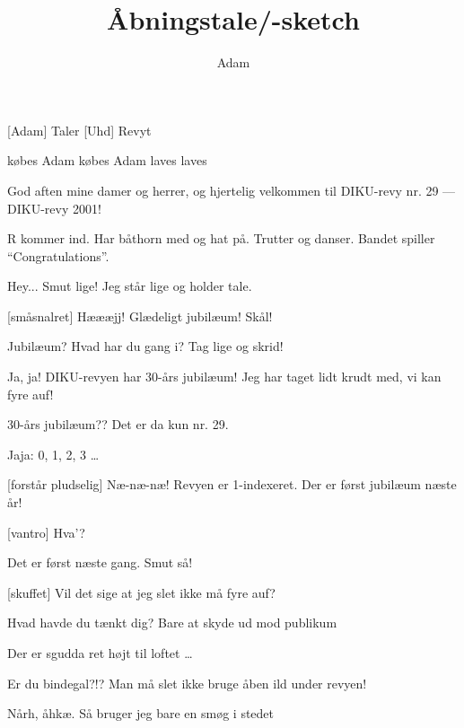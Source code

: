 \documentclass{article}
\title{Åbningstale/-sketch}
\author{Adam}
\begin{document}
\maketitle

\begin{roles}
[Adam] Taler
[Uhd] Revyt
\end{roles}

\begin{props}
 købes Adam
 købes Adam
 laves
 laves
\end{props}


\begin{sketch}

 God aften mine damer og herrer, og hjertelig velkommen til DIKU-revy
nr. 29 --- DIKU-revy 2001!

\scene R kommer ind. Har båthorn med og hat på. Trutter og danser. Bandet
spiller ``Congratulations''.

 Hey... Smut lige! Jeg står lige og holder tale.

[småsnalret] Hæææjj! Glædeligt jubilæum!  Skål!

 Jubilæum? Hvad har du gang i? Tag lige og skrid!

 Ja, ja! DIKU-revyen har 30-års jubilæum! 
Jeg har taget lidt krudt med, vi kan fyre auf! 

 30-års jubilæum?? Det er da kun nr. 29.

 Jaja:  0, 1, 2, 3 \ldots

[forstår pludselig] Næ-næ-næ! Revyen er 1-indexeret. Der er først jubilæum næste år!

[vantro] Hva'?

 Det er først næste gang. Smut så!

[skuffet] Vil det sige at jeg slet ikke må fyre auf? 

 Hvad havde du tænkt dig? Bare at skyde ud mod publikum 

 Der er sgudda ret højt til loftet \ldots

 Er du bindegal?!? Man må slet ikke bruge åben ild under revyen!

 Nårh, åhkæ. Så bruger jeg bare en smøg i stedet 


\end{sketch}
\end{document}
